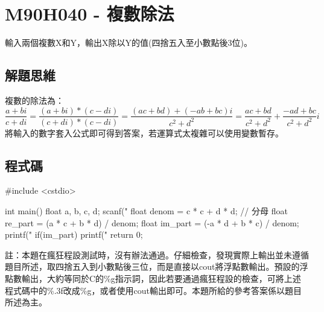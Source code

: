 \section{M90H040 - 複數除法}
輸入兩個複數X和Y，輸出X除以Y的值(四捨五入至小數點後3位)。

\subsection{解題思維}
複數的除法為：$$\frac{a+bi}{c+di}=
\frac{(a+bi)*(c-di)}{(c+di)*(c-di)}=
\frac{(ac+bd)+(-ab+bc)i}{c^2+d^2}=
\frac{ac+bd}{c^2+d^2}+\frac{-ad+bc}{c^2+d^2}i$$
將輸入的數字套入公式即可得到答案，若運算式太複雜可以使用變數暫存。

\subsection{程式碼}
\begin{cppcode}
#include <cstdio>

int main()
{
	float a, b, c, d;
	scanf("%
	float denom = c * c + d * d; // 分母
	float re_part = (a * c + b * d) / denom;
	float im_part = (-a * d + b * c) / denom;
	printf("%
	if(im_part) printf("%
	return 0;
}
\end{cppcode}
註：本題在瘋狂程設測試時，沒有辦法通過。仔細檢查，發現實際上輸出並未遵循題目所述，取四捨五入到小數點後三位，而是直接以cout將浮點數輸出。\cc{}預設的浮點數輸出，大約等同於C的\%g指示詞，因此若要通過瘋狂程設的檢查，可將上述程式碼中的\%.3f改成\%g，或者使用cout輸出即可。本題所給的參考答案係以題目所述為主。